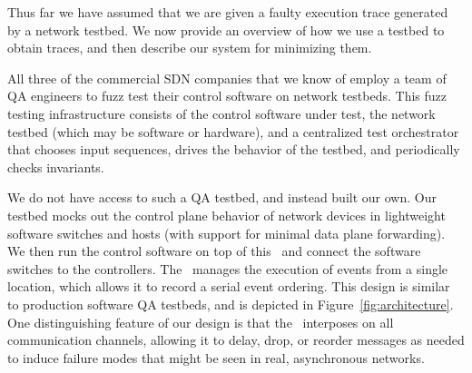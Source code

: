 
Thus far we have assumed that we are given a faulty execution
trace generated by a network testbed. We now provide an overview of
how we use a testbed to obtain traces, and then describe our system for
minimizing them.

 All three of the commercial SDN companies
that we know of employ a team of QA
engineers to fuzz test their control software on network testbeds.
This fuzz testing infrastructure
consists of the control software under test, the network testbed (which may
be software or hardware), and a centralized
test orchestrator
that chooses input sequences, drives the behavior of the testbed,
and periodically checks invariants. %


We do not have access to such a QA testbed, and instead built our own.
Our testbed mocks out the control plane
behavior of network devices in lightweight software switches and hosts (with
support for minimal data plane forwarding).
We then run the control software on
top of this \tester~and connect the software switches to the
controllers. The \tester~manages the execution of events from a single location,
which allows it to record a serial
event ordering. This design is similar to production software QA testbeds, and is
depicted in Figure~\ref{fig:architecture}. One distinguishing feature of our
design is that
the \tester~interposes on all communication
channels, allowing it to delay, drop, or reorder
messages as needed to induce failure modes that might be seen in
real, asynchronous networks.

